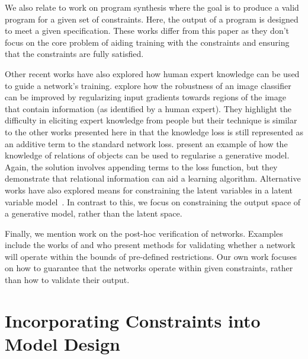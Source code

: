 \documentclass[letterpaper]{article} %
\begin{document}
We also relate to work  on program synthesis \citep{lezama2009sketching,jha2010oracle,yu2017component,osera2019constraint} where the goal is to produce a valid program for a given set of constraints.
Here, the output of a program is designed to meet a given specification.
These works differ from this paper as they don’t focus on the core problem of aiding training with the constraints and ensuring that the constraints are fully satisfied.

Other recent works have also explored how human expert knowledge can be used to guide a network's training.
\citet{ross2018improving,ross2017right} explore how the robustness of an image classifier can be improved by regularizing input gradients towards regions of the image that contain information (as identified by a human expert).
They highlight the difficulty in eliciting expert knowledge from people but their technique is similar to the other works presented here in that the knowledge loss is still represented as an additive term to the standard network loss.
\citet{takeishi2020Knowledge} present an example of how the knowledge of relations of objects can be used to regularise a generative model.
Again, the solution involves appending terms to the loss function, but they demonstrate that relational information can aid a learning algorithm.
Alternative works have also explored means for constraining the latent variables in a latent variable model~\cite{ganchev2010posterior,ganchev2007expectation}.
In contrast to this, we focus on constraining the output space of a generative model, rather than the latent space.

Finally, we mention work on the post-hoc verification of networks.
Examples include the works of \citet{katz2017reluplex} and \citet{bunel2017unified} who present methods for validating whether a network will operate within the bounds of pre-defined restrictions.
Our own work focuses on how to guarantee that the networks operate within given constraints, rather than how to validate their output.


\section{Incorporating Constraints into Model Design}
\end{document}
